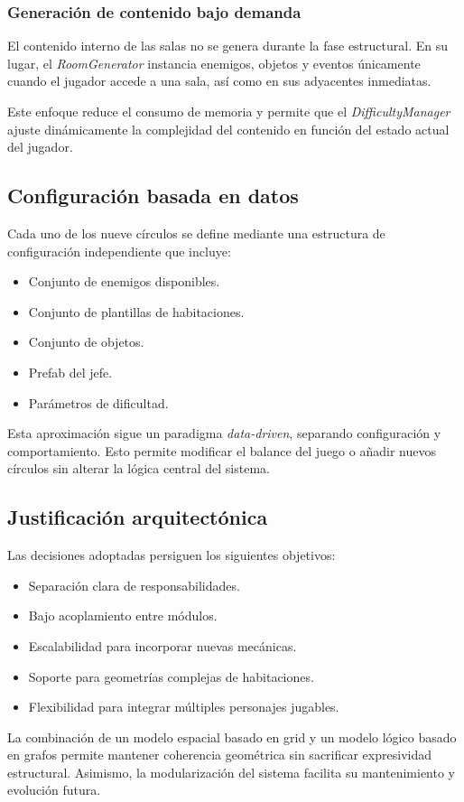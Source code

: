 \subsubsection{Generación de contenido bajo demanda}

El contenido interno de las salas no se genera durante la fase estructural. En su lugar, el \textit{RoomGenerator} instancia enemigos, objetos y eventos únicamente cuando el jugador accede a una sala, así como en sus adyacentes inmediatas.

Este enfoque reduce el consumo de memoria y permite que el \textit{DifficultyManager} ajuste dinámicamente la complejidad del contenido en función del estado actual del jugador.

\subsection{Configuración basada en datos}

Cada uno de los nueve círculos se define mediante una estructura de configuración independiente que incluye:

\begin{itemize}
    \item Conjunto de enemigos disponibles.
    \item Conjunto de plantillas de habitaciones.
    \item Conjunto de objetos.
    \item Prefab del jefe.
    \item Parámetros de dificultad.
\end{itemize}

Esta aproximación sigue un paradigma \textit{data-driven}, separando configuración y comportamiento. Esto permite modificar el balance del juego o añadir nuevos círculos sin alterar la lógica central del sistema.

\subsection{Justificación arquitectónica}

Las decisiones adoptadas persiguen los siguientes objetivos:

\begin{itemize}
    \item Separación clara de responsabilidades.
    \item Bajo acoplamiento entre módulos.
    \item Escalabilidad para incorporar nuevas mecánicas.
    \item Soporte para geometrías complejas de habitaciones.
    \item Flexibilidad para integrar múltiples personajes jugables.
\end{itemize}

La combinación de un modelo espacial basado en grid y un modelo lógico basado en grafos permite mantener coherencia geométrica sin sacrificar expresividad estructural. Asimismo, la modularización del sistema facilita su mantenimiento y evolución futura.